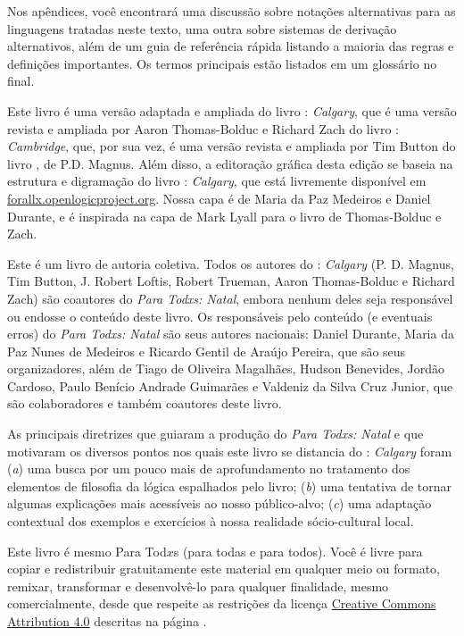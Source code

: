 Nos apêndices, você encontrará uma discussão sobre notações alternativas para as linguagens tratadas neste texto, uma outra sobre sistemas de derivação alternativos, além  de um guia de referência rápida listando a maioria das regras e definições importantes.
Os termos principais estão listados em um glossário no final.

Este livro  é uma versão adaptada e ampliada do livro \forallx: \emph{Calgary}, que é uma versão revista e ampliada por Aaron Thomas-Bolduc e Richard Zach do livro \forallx: \emph{Cambridge}, que, por sua vez, é uma versão revista e ampliada por Tim Button do livro \forallx, de P.D. Magnus.
Além disso, a editoração gráfica desta edição se baseia na estrutura e digramação do livro \forallx: \emph{Calgary}, que está livremente disponível em \hbox{\href{https://forallx.openlogicproject.org}{forallx.openlogicproject.org}}.
Nossa capa é de Maria da Paz Medeiros e Daniel Durante, e é inspirada na capa de Mark Lyall para o livro de Thomas-Bolduc e Zach.

Este é um livro de autoria coletiva. Todos os autores do \forallx: \emph{Calgary} (P. D. Magnus, Tim Button, J. Robert Loftis, Robert Trueman, Aaron Thomas-Bolduc e Richard Zach) são coautores do \textit{Para Todxs: Natal}, embora nenhum deles seja responsável ou endosse o conteúdo deste livro. Os responsáveis pelo conteúdo (e eventuais erros) do \textit{Para Todxs: Natal} são seus autores nacionais: Daniel Durante, Maria da Paz Nunes de Medeiros e Ricardo Gentil de Araújo Pereira, que são seus organizadores, além de Tiago de Oliveira Magalhães, Hudson Benevides, Jordão Cardoso, Paulo Benício Andrade Guimarães e Valdeniz da Silva Cruz Junior, que são colaboradores e também coautores deste livro.

As principais diretrizes que guiaram a produção do \textit{Para Todxs: Natal} e que motivaram os diversos pontos nos quais este livro se distancia do \forallx: \emph{Calgary} foram (\textit{a}) uma busca por um pouco mais de aprofundamento no tratamento dos elementos de filosofia da lógica espalhados pelo livro; (\textit{b}) uma tentativa de tornar algumas explicações mais acessíveis ao nosso público-alvo; (\textit{c}) uma adaptação contextual dos exemplos e exercícios à nossa realidade sócio-cultural local.

Este livro é mesmo Para Tod$x$s (para todas e para todos).
Você é livre para copiar e redistribuir gratuitamente este material em qualquer meio ou formato, remixar, transformar e desenvolvê-lo para qualquer finalidade, mesmo comercialmente, desde que respeite as restrições da licença  \href{https://creativecommons.org/licenses/by/4.0/}{Creative Commons Attribution 4.0} descritas na página \pageref{cc4by}.


